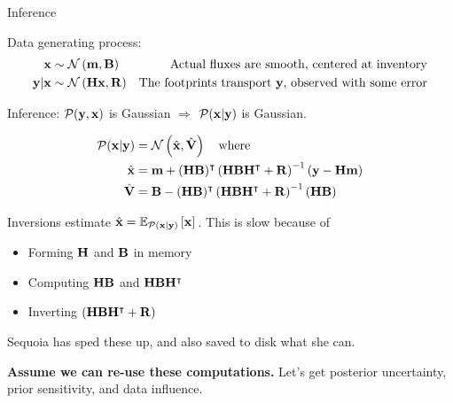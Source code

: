 \documentclass[8pt]{beamer}\usepackage[]{graphicx}\usepackage[]{color}
\begin{document}

\begin{frame}{Inference}

Data generating process:
$$
\begin{aligned}
\mathbf{x} \sim{}& \mathcal{N}\left( \mathbf{m}, \mathbf{B}\right) & 
   \textrm{Actual fluxes are smooth, centered at inventory} \\
\mathbf{y} \vert \mathbf{x} \sim{}& \mathcal{N}\left( \mathbf{H} \mathbf{x}, \mathbf{R}\right) & 
   \textrm{The footprints transport }\mathbf{y}\textrm{, observed with some error} \\
\end{aligned}
$$

Inference: $\mathcal{P}(\mathbf{y},\mathbf{x})$ is Gaussian $\Rightarrow$ $\mathcal{P}(\mathbf{x} \vert \mathbf{y})$ is Gaussian.

$$
\begin{aligned}
   \mathcal{P}(\mathbf{x} \vert \mathbf{y}) ={}& \mathcal{N}\left( \hat{\mathbf{x}}, \hat{\mathbf{V}}\right) \quad\textrm{where}\\
   \hat{\mathbf{x}} ={}& \mathbf{m} + (\mathbf{H} \mathbf{B})^\intercal \left(
      \mathbf{H} \mathbf{B} \mathbf{H}^\intercal + \mathbf{R}
    \right)^{-1} \left(\mathbf{y} - \mathbf{H} \mathbf{m} \right) \\
   \hat{\mathbf{V}} ={}& \mathbf{B} - (\mathbf{H} \mathbf{B})^\intercal \left(
      \mathbf{H} \mathbf{B} \mathbf{H}^\intercal + \mathbf{R}
   \right)^{-1} (\mathbf{H} \mathbf{B}) \\
\end{aligned}
$$

\pause

Inversions estimate $\hat{\mathbf{x}} = \mathbb{E}_{\mathcal{P}(\mathbf{x} \vert \mathbf{y})}\left[ \mathbf{x}\right]\,$.  This is slow because of
%
\begin{itemize}
\item Forming $\mathbf{H}$ and $\mathbf{B}$ in memory
\item Computing $\mathbf{H} \mathbf{B}$ and $\mathbf{H} \mathbf{B} \mathbf{H}^\intercal$
\item Inverting $\left(\mathbf{H} \mathbf{B} \mathbf{H}^\intercal + \mathbf{R}\right)$
\end{itemize}
%
Sequoia has sped these up, and also saved to disk what she can.

\textbf{Assume we can re-use these computations.}  Let's get posterior
uncertainty, prior sensitivity, and data influence.


\end{frame}


\end{document}
